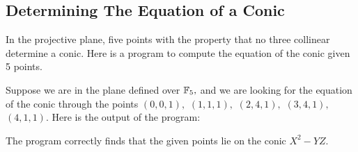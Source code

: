 \subsection{Determining The Equation of a Conic }

In the projective plane, five points with the property that no three collinear determine a conic. 
Here is a program to compute the equation of the conic given 5 points. 


{\small
{\tt

}
}


Suppose we are in the plane defined over ${\mathbb F}_5,$ and we are looking for the equation of the 
conic through the points 
$(0, 0, 1),$  
$(1, 1, 1),$ 
$(2, 4, 1),$ 
$(3, 4, 1),$ 
$(4, 1, 1).$
Here is the output of the program:


{\tt

}

The program correctly finds that the given points lie on the conic $X^2-YZ.$

